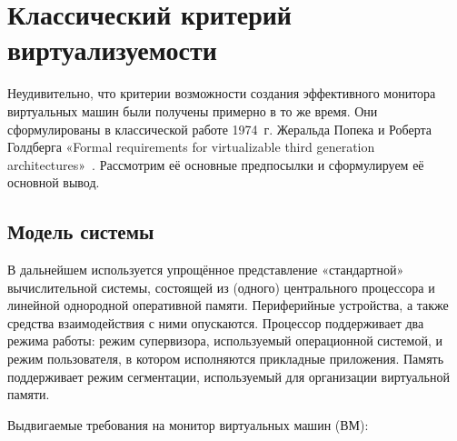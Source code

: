 \section{Классический критерий виртуализуемости}

Неудивительно, что критерии возможности создания эффективного монитора виртуальных машин были получены примерно в то же время. Они сформулированы в классической работе 1974~г. Жеральда Попека  и Роберта Голдберга «Formal requirements for virtualizable third generation architectures»~\cite{popek}. Рассмотрим её основные предпосылки и сформулируем её основной вывод.

\subsection{Модель системы}

В дальнейшем используется упрощённое представление «стандартной» вычислительной системы, состоящей из (одного) центрального процессора и линейной однородной оперативной памяти. Периферийные устройства, а также средства взаимодействия с ними опускаются. Процессор поддерживает два режима работы: режим супервизора, используемый операционной системой, и режим пользователя, в котором исполняются прикладные приложения. Память поддерживает режим сегментации, используемый для организации виртуальной памяти.

Выдвигаемые требования на монитор виртуальных машин (ВМ): 

